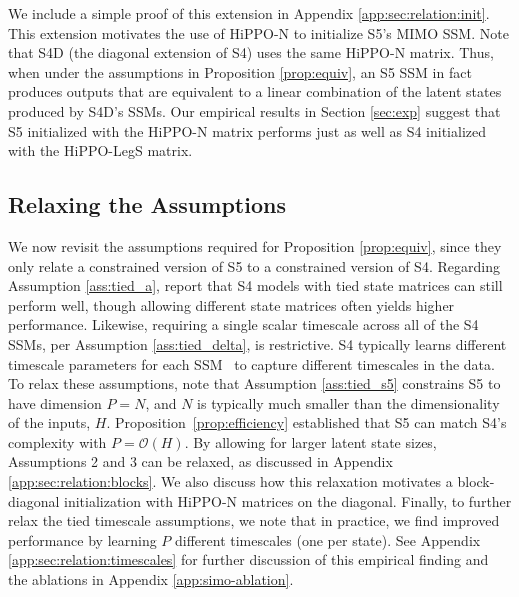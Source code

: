 We include a simple proof of this extension in Appendix \ref{app:sec:relation:init}.  This extension motivates the use of HiPPO-N to initialize S5's MIMO SSM. Note that S4D (the diagonal extension of S4) uses the same HiPPO-N matrix. Thus, when under the assumptions in Proposition \ref{prop:equiv}, an S5 SSM in fact produces outputs that are equivalent to a linear combination of the latent states produced by S4D's SSMs. Our empirical results in Section \ref{sec:exp} suggest that S5 initialized with the HiPPO-N matrix performs just as well as S4 initialized with the HiPPO-LegS matrix.  

\subsection{Relaxing the Assumptions}
\label{sec:s4s5rel:untying}

We now revisit the assumptions required for Proposition \ref{prop:equiv}, since they only relate a constrained version of S5 to a constrained version of S4. Regarding Assumption \ref{ass:tied_a}, \citet{gu2021s4} report that S4 models with tied state matrices can still perform well, though allowing different state matrices often yields higher performance. Likewise, requiring a single scalar timescale across all of the S4 SSMs, per Assumption \ref{ass:tied_delta}, is restrictive.  S4 typically learns different timescale parameters for each SSM~\citep{gu2022train} to capture different timescales in the data. To relax these assumptions, note that Assumption \ref{ass:tied_s5} constrains S5 to have dimension $P=N$, and $N$ is typically much smaller than the dimensionality of the inputs, $H$. Proposition~\ref{prop:efficiency} established that S5 can match S4's complexity with $P = \mathcal{O}(H)$. By allowing for larger latent state sizes, Assumptions 2 and 3 can be relaxed, as discussed in Appendix \ref{app:sec:relation:blocks}. We also discuss how this relaxation motivates a block-diagonal initialization with HiPPO-N matrices on the diagonal. Finally, to further relax the tied timescale assumptions, we note that in practice, we find improved performance by learning $P$ different timescales (one per state). See Appendix \ref{app:sec:relation:timescales} for further discussion of this empirical finding and the ablations in Appendix \ref{app:simo-ablation}.

